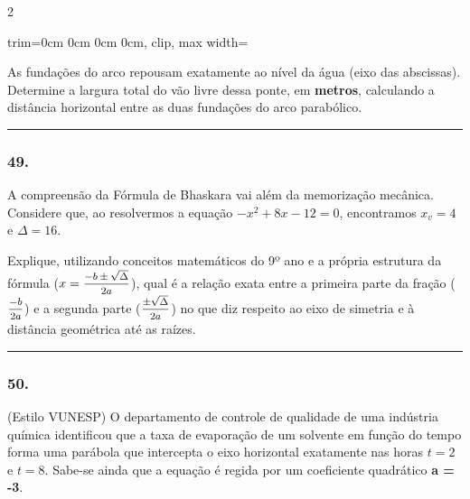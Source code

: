\documentclass[twoside, 10pt, a4paper]{article}
\newlength{\espacoPreQuestao}
\newlength{\espacoQuestao}
\begin{document}
\begin{multicols*}{2}
\begin{center}
\begin{adjustbox}{trim=0cm 0cm 0cm 0cm, clip, max width=\linewidth}
\end{adjustbox}
\end{center}

As fundações do arco repousam exatamente ao nível da água (eixo das abscissas). Determine a largura total do vão livre dessa ponte, em \textbf{metros}, calculando a distância horizontal entre as duas fundações do arco parabólico.
\par\vspace{\espacoQuestao}

\noindent\textcolor{CorLinha}{\rule{\linewidth}{0.5pt}} 
\par\vspace{\espacoPreQuestao}
\subsubsection*{49.} A compreensão da Fórmula de Bhaskara vai além da memorização mecânica. Considere que, ao resolvermos a equação $-x^2 + 8x - 12 = 0$, encontramos $x_v = 4$ e $\Delta = 16$. 

Explique, utilizando conceitos matemáticos do 9º ano e a própria estrutura da fórmula ($x = \mfrac{-b \pm \sqrt{\Delta}}{2a}$), qual é a relação exata entre a primeira parte da fração ($\mfrac{-b}{2a}$) e a segunda parte ($\mfrac{\pm \sqrt{\Delta}}{2a}$) no que diz respeito ao eixo de simetria e à distância geométrica até as raízes.
\par\vspace{\espacoQuestao}

\noindent\textcolor{CorLinha}{\rule{\linewidth}{0.5pt}} 
\par\vspace{\espacoPreQuestao}
\subsubsection*{50.} (Estilo VUNESP) O departamento de controle de qualidade de uma indústria química identificou que a taxa de evaporação de um solvente em função do tempo forma uma parábola que intercepta o eixo horizontal exatamente nas horas $t = 2$ e $t = 8$. Sabe-se ainda que a equação é regida por um coeficiente quadrático \textbf{a = -3}.


\end{multicols*}
\end{document}
